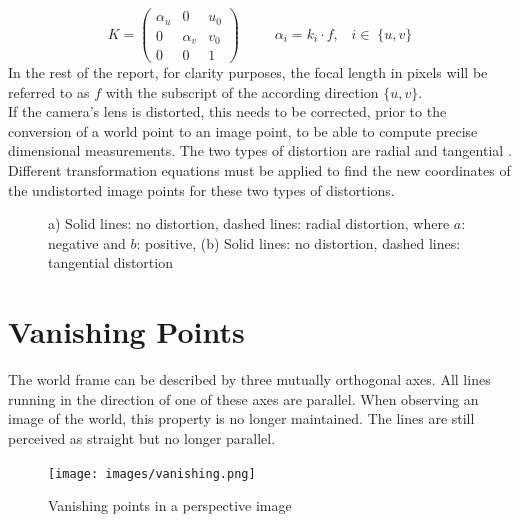 \begin{equation}
K = \begin{pmatrix} \alpha_u & 0 & u_0\\ 0 & \alpha_v & v_0 \\ 0 & 0 & 1 \end{pmatrix}
\; \; \; \; \;  \; \;  \; \; \alpha_i = k_i \cdot f,  \; \; \; i \in  \; \{u,v\}
  \label{eq:instrinsics}
\end{equation}
In the rest of the report, for clarity purposes, the focal length in pixels will be referred to as $f$ with the subscript of the according direction $\{u,v \}$.\\

If the camera's lens is distorted, this needs to be corrected, prior to the conversion of a world point to an image point, to be able to compute precise dimensional measurements. The two types of distortion are radial and tangential \citep{weng1992camera}. Different transformation equations must be applied to find the new coordinates of the undistorted image points for these two types of distortions.
\begin{figure}[h]
    \centering
    \caption{a) Solid lines: no distortion, dashed lines: radial distortion, where $a$: negative and $b$: positive, (b) Solid lines: no distortion, dashed lines: tangential distortion\citep{weng1992camera}}
    \label{pics:distort}
\end{figure}
\newpage







\section{Vanishing Points}
The world frame can be described by three mutually orthogonal axes. All lines running in the direction of one of these axes are parallel. When observing an image of the world, this property is no longer maintained. The lines are still perceived as straight but no longer parallel.

\begin{figure}[h!]
   \centering
   \texttt{[image: images/vanishing.png]}
   \caption{Vanishing points in a perspective image \citep{magee1984determining}}
   \label{pics:vanishing}
\end{figure}

